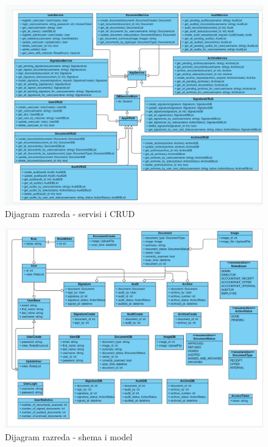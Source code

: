 			\begin{figure}[H]
				\includegraphics[width=\textwidth]{slike/razredi_serviceCRUD.jpg} 
				\caption{Dijagram razreda - servisi i CRUD}
				\label{fig:dijagramRazreda1}
			\end{figure}
			
			\begin{figure}[H]
				\includegraphics[width=\textwidth]{slike/razredi_shemaModel.jpg} 
				\caption{Dijagram razreda - shema i model}
				\label{fig:dijagramRazreda2}
			\end{figure}
			
			
